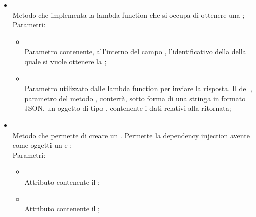 \begin{itemize}
\begin{itemize}
\begin{itemize}
		\end{itemize}
		\item[]  \\
		Metodo che implementa la lambda function che si occupa di ottenere una ;\\
		Parametri:
		\begin{itemize}
			\item {} \\
			Parametro contenente, all'interno del campo , l'identificativo della  della quale si vuole ottenere la ;
			\item {} \\
			Parametro utilizzato dalle lambda function per inviare la risposta. Il  del , parametro del metodo , conterrà, sotto forma di una stringa in formato JSON, un oggetto di tipo , contenente i dati relativi alla  ritornata;
		\end{itemize}
		\item[]  \\
		Metodo che permette di creare un . Permette la dependency injection avente come oggetti un  e ;\\
		Parametri:
		\begin{itemize}
			\item {} \\
			Attributo contenente il ;
			\item {} \\
			Attributo contenente il ;
		\end{itemize}
	\end{itemize}
\end{itemize}
\FloatBarrier

